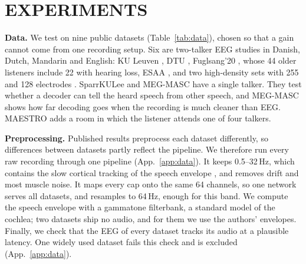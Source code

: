 \documentclass[twoside]{article}
\begin{document}
\section{EXPERIMENTS}\label{sec:exp}
\textbf{Data.} We test on nine public datasets (Table~\ref{tab:data}), chosen so that a gain
cannot come from one recording setup. Six are two-talker EEG studies in Danish, Dutch,
Mandarin and English: KU Leuven \citep{das2016kul}, DTU \citep{fuglsang2017dtu}, Fuglsang'20
\citep{fuglsang2020effects}, whose 44 older listeners include 22 with hearing loss, ESAA
\citep{li2022esaa}, and two high-density sets with 255 \citep{narayanan2021uhd} and 128
electrodes \citep{broderick2018semantic}. SparrKULee \citep{accou2024sparrkulee} and MEG-MASC
\citep{gwilliams2023megmasc} have a single talker. They test whether a decoder can tell the
heard speech from other speech, and MEG-MASC shows how far decoding goes when the recording
is much cleaner than EEG. MAESTRO \citep{maestro2026} adds a room in which the listener
attends one of four talkers.

\textbf{Preprocessing.} Published results preprocess each dataset differently, so
differences between datasets partly reflect the pipeline. We therefore run every raw
recording through one pipeline (App.~\ref{app:data}). It keeps 0.5--32\,Hz, which contains the
slow cortical tracking of the speech envelope \citep{ding2012emergence}, and removes drift
and most muscle noise. It maps every cap onto the same 64 channels, so one network serves all
datasets, and resamples to 64\,Hz, enough for this band. We compute the speech envelope with
a gammatone filterbank, a standard model of the cochlea; two datasets ship no audio, and for
them we use the authors' envelopes. Finally, we check that the EEG of every dataset tracks
its audio at a plausible latency. One widely used dataset fails this check and is excluded
(App.~\ref{app:data}).
\end{document}
